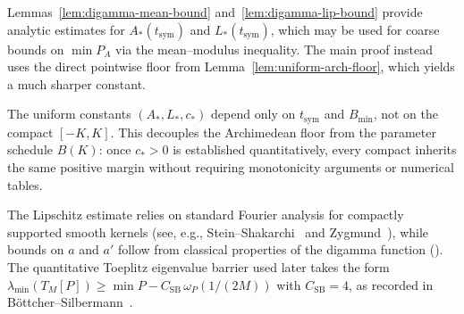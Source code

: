 \begin{remark}\label{rem:aux-mean-modulus}
Lemmas~\ref{lem:digamma-mean-bound} and~\ref{lem:digamma-lip-bound} provide analytic estimates for
$A_*(t_{\mathrm{sym}})$ and $L_*(t_{\mathrm{sym}})$, which may be used for coarse bounds on $\min P_A$
via the mean--modulus inequality.  The main proof instead uses the direct pointwise floor from
Lemma~\ref{lem:uniform-arch-floor}, which yields a much sharper constant.
\end{remark}

\begin{remark}\label{rem:uniform-vs-compact}
The uniform constants $(A_*, L_*, c_*)$ depend only on $t_{\mathrm{sym}}$ and $B_{\min}$, not on the compact $[-K,K]$.
This decouples the Archimedean floor from the parameter schedule $B(K)$: once $c_*>0$ is established quantitatively,
every compact inherits the same positive margin without requiring monotonicity arguments or numerical tables.
\end{remark}

\begin{remark}[References]
The Lipschitz estimate relies on standard Fourier analysis for compactly supported smooth kernels (see, e.g., Stein--Shakarchi~\cite[Ch.~2]{SteinShakarchi2003} and Zygmund~\cite[Ch.~I]{Zygmund2002}), while bounds on $a$ and $a'$ follow from classical properties of the digamma function (\cite[\S5.2]{NISTDLMF}).  The quantitative Toeplitz eigenvalue barrier used later takes the form $\lambda_{\min}(T_M[P])\ge\min P - C_{\mathrm{SB}}\,\omega_P(1/(2M))$ with $C_{\mathrm{SB}}=4$, as recorded in B\"ottcher--Silbermann~\cite[Ch.~5]{BoettcherSilbermann2006}.
\end{remark}
